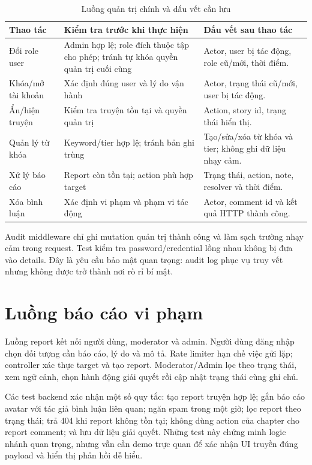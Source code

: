 \begin{table}[htbp]
\centering
\caption{Luồng quản trị chính và dấu vết cần lưu}
\label{tab:admin-audit}
\begin{tabularx}{\textwidth}{|>{\RaggedRight\arraybackslash}p{4.2cm}|X|X|}
\hline
\textbf{Thao tác} & \textbf{Kiểm tra trước khi thực hiện} & \textbf{Dấu vết sau thao tác} \\
\hline
Đổi role user & Admin hợp lệ; role đích thuộc tập cho phép; tránh tự khóa quyền quản trị cuối cùng & Actor, user bị tác động, role cũ/mới, thời điểm. \\
\hline
Khóa/mở tài khoản & Xác định đúng user và lý do vận hành & Actor, trạng thái cũ/mới, user bị tác động. \\
\hline
Ẩn/hiện truyện & Kiểm tra truyện tồn tại và quyền quản trị & Action, story id, trạng thái hiển thị. \\
\hline
Quản lý từ khóa & Keyword/tier hợp lệ; tránh bản ghi trùng & Tạo/sửa/xóa từ khóa và tier; không ghi dữ liệu nhạy cảm. \\
\hline
Xử lý báo cáo & Report còn tồn tại; action phù hợp target & Trạng thái, action, note, resolver và thời điểm. \\
\hline
Xóa bình luận & Xác định vi phạm và phạm vi tác động & Actor, comment id và kết quả HTTP thành công. \\
\hline
\end{tabularx}
\end{table}

Audit middleware chỉ ghi mutation quản trị thành công và làm sạch trường nhạy cảm trong request. Test kiểm tra password/credential lồng nhau không bị đưa vào details. Đây là yêu cầu bảo mật quan trọng: audit log phục vụ truy vết nhưng không được trở thành nơi rò rỉ bí mật.

\section{Luồng báo cáo vi phạm}

Luồng report kết nối người dùng, moderator và admin. Người dùng đăng nhập chọn đối tượng cần báo cáo, lý do và mô tả. Rate limiter hạn chế việc gửi lặp; controller xác thực target và tạo report. Moderator/Admin lọc theo trạng thái, xem ngữ cảnh, chọn hành động giải quyết rồi cập nhật trạng thái cùng ghi chú.

Các test backend xác nhận một số quy tắc: tạo report truyện hợp lệ; gắn báo cáo avatar với tác giả bình luận liên quan; ngăn spam trong một giờ; lọc report theo trạng thái; trả 404 khi report không tồn tại; không dùng action của chapter cho report comment; và lưu dữ liệu giải quyết. Những test này chứng minh logic nhánh quan trọng, nhưng vẫn cần demo trực quan để xác nhận UI truyền đúng payload và hiển thị phản hồi dễ hiểu.

